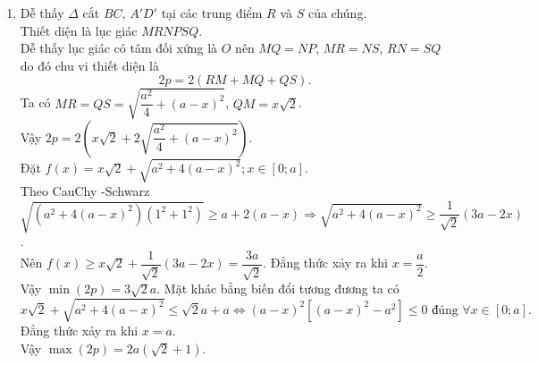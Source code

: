 \begin{bt}
{\begin{enumerate}
{}\noindent
\item Dễ thấy $\Delta$ cắt $BC$, $A'D'$ tại các trung điểm $R$ và $S$ của chúng.\\
Thiết diện là lục giác $MRNPSQ$.\\
Dễ thấy lục giác có tâm đối xứng là $O$ nên $MQ=NP$, $MR=NS$, $RN=SQ$ do đó chu vi thiết diện là
$$2p=2(RM+MQ+QS).$$
Ta có $MR=QS=\sqrt{\dfrac{a^2}{4}+(a-x)^2}$, $QM=x\sqrt{2}$.\\
Vậy $2p=2\left(x\sqrt{2}+2\sqrt{\dfrac{a^2}{4}+(a-x)^2}\right)$.\\
Đặt $f(x)=x\sqrt{2}+\sqrt{a^2+4(a-x)^2};x \in [0;a]$.\\
Theo CauChy -Schwarz
$\sqrt{\left(a^2+4(a-x)^2\right)\left(1^2+1^2\right)} \geq a+2(a-x) \Rightarrow \sqrt{a^2+4(a-x)^2} \geq \dfrac{1}{\sqrt{2}}(3a-2x)$.\\
Nên $f(x) \geq x\sqrt{2}+\dfrac{1}{\sqrt{2}}(3a-2x)=\dfrac{3a}{\sqrt{2}}$. Đẳng thức xảy ra khi $x=\dfrac{a}{2}$.\\
Vậy $\min (2p)=3\sqrt{2}a$.
Mặt khác bằng biến đổi tương đương ta có $$x\sqrt{2}+\sqrt{a^2+4(a-x)^2} \leq \sqrt{2}a+a \Leftrightarrow (a-x)^2\left[(a-x)^2-a^2\right] \leq 0 \text{ đúng } \forall x \in[0 ; a].$$ 
 Đẳng thức xảy ra khi $x=a$.\\
 Vậy $\max (2p)=2a(\sqrt{2}+1)$.
\end{enumerate}
}
\end{bt}

